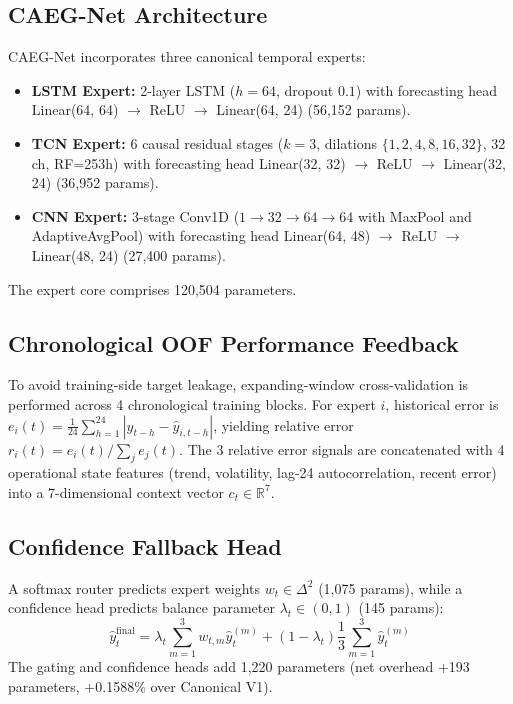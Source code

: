 \documentclass[journal,10pt,twocolumn]{IEEEtran}
\begin{document}
\subsection{CAEG-Net Architecture}
CAEG-Net incorporates three canonical temporal experts:
\begin{itemize}
    \item \textbf{LSTM Expert:} 2-layer LSTM ($h=64$, dropout $0.1$) with forecasting head Linear(64, 64) $\to$ ReLU $\to$ Linear(64, 24) (56,152 params).
    \item \textbf{TCN Expert:} 6 causal residual stages ($k=3$, dilations $\{1, 2, 4, 8, 16, 32\}$, 32 ch, RF=253h) with forecasting head Linear(32, 32) $\to$ ReLU $\to$ Linear(32, 24) (36,952 params).
    \item \textbf{CNN Expert:} 3-stage Conv1D ($1 \to 32 \to 64 \to 64$ with MaxPool and AdaptiveAvgPool) with forecasting head Linear(64, 48) $\to$ ReLU $\to$ Linear(48, 24) (27,400 params).
\end{itemize}
The expert core comprises 120,504 parameters.

\subsection{Chronological OOF Performance Feedback}
To avoid training-side target leakage, expanding-window cross-validation is performed across 4 chronological training blocks. For expert $i$, historical error is $e_i(t) = \frac{1}{24} \sum_{h=1}^{24} |y_{t-h} - \hat{y}_{i, t-h}|$, yielding relative error $r_i(t) = e_i(t) / \sum_j e_j(t)$. The 3 relative error signals are concatenated with 4 operational state features (trend, volatility, lag-24 autocorrelation, recent error) into a 7-dimensional context vector $c_t \in \mathbb{R}^7$.

\subsection{Confidence Fallback Head}
A softmax router predicts expert weights $w_t \in \Delta^2$ (1,075 params), while a confidence head predicts balance parameter $\lambda_t \in (0, 1)$ (145 params):
\begin{equation}
\hat{y}_{t}^{\mathrm{final}} = \lambda_t \sum_{m=1}^3 w_{t, m} \hat{y}_{t}^{(m)} + (1 - \lambda_t) \frac{1}{3} \sum_{m=1}^3 \hat{y}_{t}^{(m)}
\end{equation}
The gating and confidence heads add 1,220 parameters (net overhead +193 parameters, +0.1588\% over Canonical V1).
\end{document}
